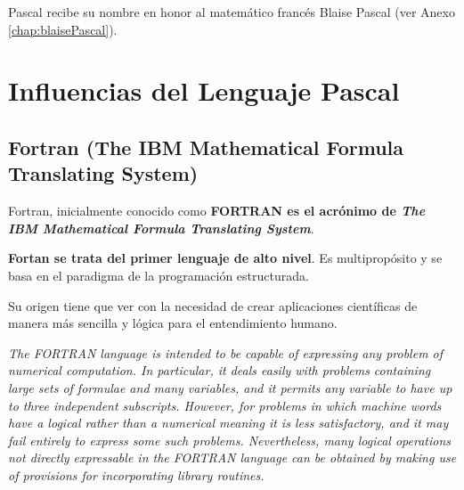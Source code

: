 Pascal recibe su nombre en honor al matemático francés Blaise Pascal (ver Anexo \ref{chap:blaisePascal}).



\section{Influencias del Lenguaje Pascal}

\subsection{Fortran (The IBM Mathematical Formula Translating System)}

Fortran, inicialmente conocido como \textbf{FORTRAN es el acrónimo de
\textit{The IBM
Mathematical Formula Translating System}}. 

\textbf{Fortan se trata del primer lenguaje de alto nivel}. Es multipropósito y
se basa
en el paradigma de la programación estructurada.

Su origen tiene que ver con la necesidad de crear aplicaciones científicas de
manera más sencilla y lógica para el entendimiento humano.

\textit{The FORTRAN language is intended to be capable of expressing any
problem of
numerical computation. In particular, it deals easily with problems containing
large sets of formulae and many variables, and it permits any variable to have
up to three independent subscripts. However, for problems in which machine words
have a logical rather than a numerical meaning it is less satisfactory, and it
may fail entirely to express some such problems. Nevertheless, many logical
operations not directly expressable in the FORTRAN language can be obtained by
making use of provisions for incorporating library routines.}
\cite{article/iso/fortran66}

